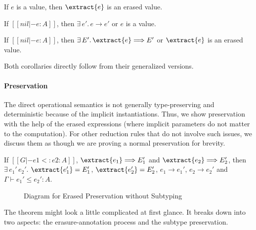 \begin{lemma}
    If $e$ is a value, then $\extract{e}$ is an erased value.
\end{lemma}

\begin{corollary}[Progress]
    If $[[nil |- e : A]]$,
    then $\exists \, e'. \, e \longrightarrow e'$ or $e$ is a value.
\end{corollary}

\begin{corollary}
    If $[[nil |- e : A]]$,
    then $\exists \, E'. \, \extract{e} \Longrightarrow E'$ or $\extract{e}$ is an erased value.
\end{corollary}

Both corollaries directly follow from their generalized versions.

\paragraph{Preservation}
The direct operational semantics is not generally type-preserving and
deterministic because of the implicit instantiations. Thus, we show
preservation with the help of the erased expressions (where implicit parameters
do not matter to the computation). For other reduction rules that do not involve
such issues, we discuss them as though we are proving a normal preservation
for brevity.

\begin{theorem}
    If $[[G |- e1 <: e2 : A]]$, $\extract{e_1} \Longrightarrow E_1'$ and $\extract{e_2} \Longrightarrow E_2'$,
    then $\exists\,e_1' \, e_2'.$ $\extract{e_1'} = E_1'$, $\extract{e_2'} = E_2'$,
    $e_1 \longrightarrow e_1'$, $e_2 \longrightarrow e_2'$ and $\Gamma \vdash e_1' \le e_2' : A$.
\end{theorem}

\begin{figure}
    \centering
    \caption{Diagram for Erased Preservation without Subtyping}
    \label{fig:preservation}
\end{figure}

\noindent The theorem might look a little complicated at first glance. It breaks
down into two aspects: the erasure-annotation process and the subtype preservation.

